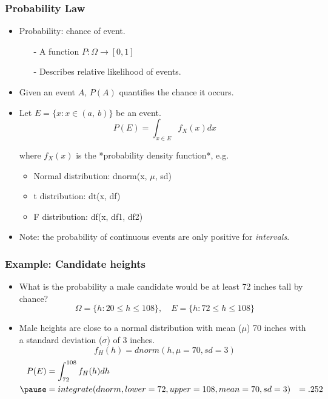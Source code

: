 \documentclass[aspectratio=169, handout]{beamer}
\numberwithin{equation}{section}
\begin{document}
\begin{frame}
\frametitle{Probability Law}
\begin{itemize}
\item \alert{Probability}: chance of event.
\begin{itemize}
\item[-] A function $P: \Omega \rightarrow [0,1]$
\item[-] Describes relative likelihood of events.
\end{itemize}\pause 
\item Given an event $A$, $P(A)$ quantifies the chance it occurs.\pause 
\item Let $E=\{x : x \in(a,\ b)\}$ be an event.
$$P(E)=\int_{x \in E} f_X(x) dx$$
\item[] where $f_X(x)$ is the *probability density function*, e.g.
\begin{itemize}
\item Normal distribution: dnorm(x, $\mu$, sd)
\item t distribution: dt(x, df)
\item F distribution: df(x, df1, df2)
\end{itemize}
\item Note: the probability of continuous events are only positive for \emph{intervals}.
\end{itemize}
\end{frame}


\begin{frame}
\frametitle{Example: Candidate heights}
\begin{itemize}
\item What is the probability a male candidate would be at least 72 inches tall by chance?
$$\Omega = \{h: 20 \leq h \leq 108\}, \quad E = \{h: 72 \leq h \leq 108\}$$\pause 
\item Male heights are close to a normal distribution with mean ($\mu$) 70 inches with a standard deviation ($\sigma$) of 3 inches.
$$f_H(h) =dnorm(h, \mu= 70, sd = 3)$$
\begin{align*}
P(E)&=\int_{72}^{108} f_H(h) dh\\\pause
&= integrate(dnorm, lower=72, upper=108, mean= 70, sd = 3)
&=.252
\end{align*}
\end{itemize}
\end{frame}
\end{document}
